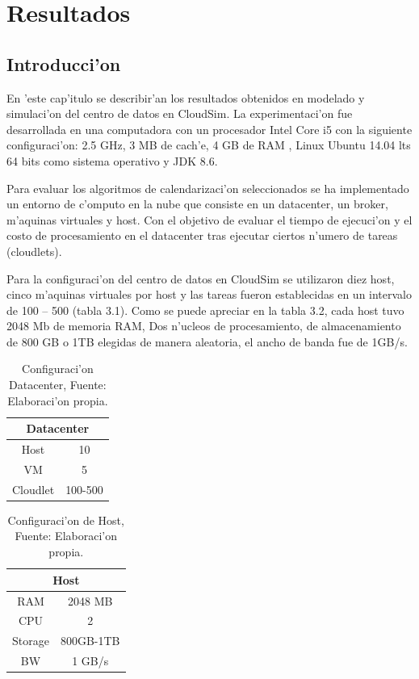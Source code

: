 \chapter{Resultados}
\section*{Introducci'on}

En 'este cap'itulo se describir'an los resultados obtenidos en modelado y simulaci'on del centro de datos en CloudSim. La experimentaci'on fue desarrollada en una computadora con  un procesador Intel Core i5  con la siguiente configuraci'on: 2.5 GHz, 3 MB de cach'e, 4 GB de RAM , Linux Ubuntu 14.04 lts 64 bits como sistema operativo y JDK 8.6.

Para evaluar los algoritmos de calendarizaci'on seleccionados se ha implementado un entorno de c'omputo en la nube que consiste en un datacenter, un broker, m'aquinas virtuales y host.  Con el objetivo de evaluar el tiempo de ejecuci'on y el costo de procesamiento en el datacenter tras ejecutar ciertos n'umero de tareas (cloudlets).

Para la configuraci'on del centro de datos en CloudSim se utilizaron diez host, cinco m'aquinas virtuales por host y las tareas fueron establecidas en un intervalo de 100 – 500 (tabla 3.1).
Como se puede apreciar en la tabla 3.2, cada host tuvo 2048 Mb de memoria RAM, Dos n'ucleos de procesamiento, de almacenamiento de 800 GB o 1TB elegidas de manera aleatoria, el ancho de banda fue de 1GB/s.


\begin{table}[]
	\centering
	\caption{Configuraci'on Datacenter, Fuente: Elaboraci'on propia.}
	\label{my-label}
	\begin{tabular}{@{}cc@{}}
		\toprule
		\multicolumn{2}{c}{{\bf Datacenter}} \\ \midrule
		Host              & 10               \\
		VM                & 5                \\
		Cloudlet          & 100-500          \\ \bottomrule
	\end{tabular}
\end{table}

\begin{table}[]
	\centering
	\caption{Configuraci'on de Host, Fuente: Elaboraci'on propia.}
	\label{my-label}
	\begin{tabular}{@{}cc@{}}
		\toprule
		\multicolumn{2}{c}{{\bf Host}} \\ \midrule
		RAM           & 2048 MB        \\
		CPU           & 2              \\
		Storage       & 800GB-1TB      \\ \midrule
		BW            & 1 GB/s        
	\end{tabular}
\end{table}

